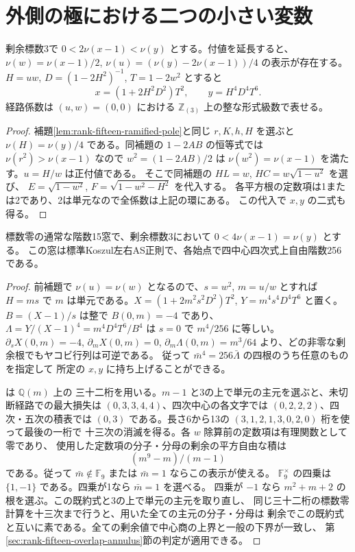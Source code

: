 \section{外側の極における二つの小さい変数}
\label{sec:rank-fifteen-outer-pole}
\begin{lemma}\label{lem:rank-fifteen-outer-pole}
剰余標数3で $0<2\nu(x-1)<\nu(y)$ とする。付値を延長すると、
$\nu(w)=\nu(x-1)/2$, $\nu(u)=(\nu(y)-2\nu(x-1))/4$ の表示が存在する。
$H=uw$, $D=(1-2H^2)^{-1}$, $T=1-2w^2$ とすると
\[
             x=(1+2H^2D^2)T^2,\qquad y=H^4D^4 T^6.
\]
経路係数は $(u,w)=(0,0)$ における $\mathbb Z_{(3)}$ 上の整な形式級数で表せる。
\end{lemma}
\begin{proof}
補題\ref{lem:rank-fifteen-ramified-pole}と同じ $r,K,h,H$ を選ぶと
$\nu(H)=\nu(y)/4$ である。同補題の $1-2AB$ の恒等式では
$\nu(r^2)>\nu(x-1)$ なので $w^2=(1-2AB)/2$ は
$\nu(w^2)=\nu(x-1)$ を満たす。$u=H/w$ は正付値である。
そこで同補題の $HL=w$, $HC=w\sqrt{1-u^2}$ を選び、
$E=\sqrt{1-w^2}$, $F=\sqrt{1-w^2-H^2}$ を代入する。
各平方根の定数項は1または2であり、2は単元なので全係数は上記の環にある。
この代入で $x,y$ の二式も得る。
\end{proof}

\begin{theorem}\label{thm:rank-fifteen-outer-pole}
標数零の通常な階数15窓で、剰余標数3において $0<4\nu(x-1)=\nu(y)$ とする。
この窓は標準Koszul左右AS正則で、各始点で四中心四次式上自由階数256である。
\end{theorem}
\begin{proof}
前補題で $\nu(u)=\nu(w)$ となるので、$s=w^2$, $m=u/w$ とすれば $H=ms$ で
$m$ は単元である。$X=(1+2m^2s^2D^2)T^2$, $Y=m^4s^4D^4T^6$ と置く。
$B=(X-1)/s$ は整で $B(0,m)=-4$ であり、
$\Lambda=Y/(X-1)^4=m^4D^4T^6/B^4$ は $s=0$ で $m^4/256$ に等しい。
$\partial_s X(0,m)=-4$, $\partial_m X(0,m)=0$,
$\partial_m\Lambda(0,m)=m^3/64$ より、どの非零な剰余根でもヤコビ行列は可逆である。
従って $\bar m^4=256\bar\Lambda$ の四根のうち任意のものを指定して
所定の $x,y$ に持ち上げることができる。

 は $\mathbb Q(m)$ 上の
三十二桁を用いる。$m-1$ と3の上で単元の主元を選ぶと、未切断経路での最大損失は
$(0,3,3,4,4)$、四次中心の各文字では $(0,2,2,2)$、四次・五次の積表では
$(0,3)$ である。長さ6から13の $(3,1,2,1,3,0,2,0)$ 桁を使って最後の一桁で
十三次の消滅を得る。各 $w$ 除算前の定数項は有理関数として零であり、
使用した定数項の分子・分母の剰余の平方自由な積は
\[
                    (m^9-m)/(m-1)
\]
である。従って $\bar m\notin\mathbb F_9$ または $\bar m=1$ ならこの表示が使える。
$\mathbb F_9^\times$ の四乗は $\{1,-1\}$ である。四乗が1なら $\bar m=1$ を選べる。
四乗が $-1$ なら $m^2+m+2$ の根を選ぶ。この既約式と3の上で単元の主元を取り直し、
同じ三十二桁の標数零計算を十三次まで行うと、用いた全ての主元の分子・分母は
剰余でこの既約式と互いに素である。全ての剰余値で中心商の上界と一般の下界が一致し、
第\ref{sec:rank-fifteen-overlap-annulus}節の判定が適用できる。
\end{proof}
